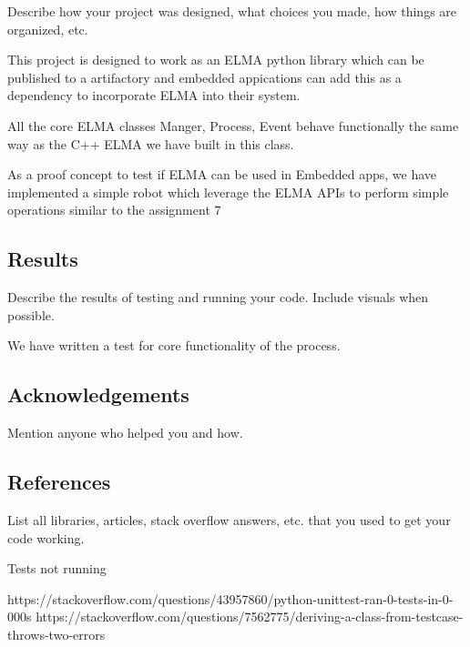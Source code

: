 Describe how your project was designed, what choices you made, how things are organized, etc.
\begin{DoxyEnumerate}
\item This project is designed to work as an E\+L\+MA python library which can be published to a artifactory and embedded appications can add this as a dependency to incorporate E\+L\+MA into their system.
\end{DoxyEnumerate}
\begin{DoxyEnumerate}
\item All the core E\+L\+MA classes Manger, Process, Event behave functionally the same way as the C++ E\+L\+MA we have built in this class.
\end{DoxyEnumerate}
\begin{DoxyEnumerate}
\item As a proof concept to test if E\+L\+MA can be used in Embedded apps, we have implemented a simple robot which leverage the E\+L\+MA A\+P\+Is to perform simple operations similar to the assignment 7 \subsection*{Results }
\end{DoxyEnumerate}

Describe the results of testing and running your code. Include visuals when possible.
\begin{DoxyEnumerate}
\item We have written a test for core functionality of the process.
\end{DoxyEnumerate}

\subsection*{Acknowledgements }

Mention anyone who helped you and how.

\subsection*{References }

List all libraries, articles, stack overflow answers, etc. that you used to get your code working.

Tests not running \begin{DoxyVerb}https://stackoverflow.com/questions/43957860/python-unittest-ran-0-tests-in-0-000s
https://stackoverflow.com/questions/7562775/deriving-a-class-from-testcase-throws-two-errors 
\end{DoxyVerb}


